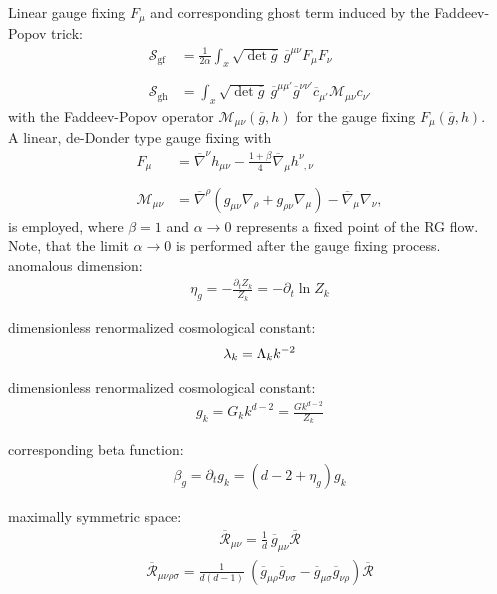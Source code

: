 Linear gauge fixing $F_{\mu}$ and corresponding ghost term induced by the Faddeev-Popov trick:
\begin{align}
\mathcal{S}_{\text{gf}} &= \frac{1}{2\alpha} \int_x \sqrt{\operatorname{det}\overline{g}} \  \overline{g}^{\mu\nu} F_{\mu}F_{\nu}	\nonumber\\
\phantom{.} \\
\mathcal{S}_{\text{gh}} &= \int_x \sqrt{\operatorname{det}\overline{g}} \  \overline{g}^{\mu\mu'} \overline{g}^{\nu\nu'}\overline{c}_{\mu'} \mathcal{M}_{\mu\nu}  c_{\nu'} \nonumber
\end{align}
with the Faddeev-Popov operator $\mathcal{M}_{\mu\nu}(\overline{g},h)$ for the gauge fixing $F_{\mu}(\overline{g},h)$. \\
A linear, de-Donder type gauge fixing with 
\begin{align}
	F_{\mu} &= \overline{\nabla}^{\nu}h_{\mu\nu} - \frac{1+\beta}{4}\overline{\nabla}_{\mu}h^{\nu}_{\phantom{\nu},\nu} \nonumber \\
	\phantom{.} \\
	\mathcal{M}_{\mu\nu} &= \overline{\nabla}^{\rho}(g_{\mu\nu}\nabla_{\rho} + g_{\rho\nu}\nabla_{\mu}) - \overline{\nabla}_{\mu}\nabla_{\nu}, \nonumber
\end{align}
is employed, where $\beta=1$ and $\alpha\rightarrow 0$ represents a fixed point of the RG flow. Note, that the limit  $\alpha\rightarrow 0$ is performed after the gauge fixing process.  \\

anomalous dimension: 
\begin{align*}
	\eta_g = -\frac{\partial_t Z_k}{Z_k} = -\partial_t \ln Z_k
\end{align*}

dimensionless renormalized cosmological constant:
\begin{align*}
	\lambda_k = \Lambda_k k^{-2}
\end{align*}

dimensionless renormalized cosmological constant:
\begin{align*}
	g_k = G_k k^{d-2} = \frac{Gk^{d-2}}{Z_k}
\end{align*}

corresponding beta function:
\begin{align}
	\beta_g = \partial_t g_k = \left(d-2 + \eta_g\right)g_k
\end{align}

maximally symmetric space:
\begin{align}
	\overline{\mathcal{R}}_{\mu\nu} = \frac{1}{d} \ \overline{g}_{\mu\nu} \overline{\mathcal{R}}
\end{align}
\begin{align}
	\overline{\mathcal{R}}_{\mu\nu\rho\sigma} = \frac{1}{d(d-1)} \ (\overline{g}_{\mu\rho}\overline{g}_{\nu\sigma} - \overline{g}_{\mu\sigma}\overline{g}_{\nu\rho}) \overline{\mathcal{R}}
\end{align}

